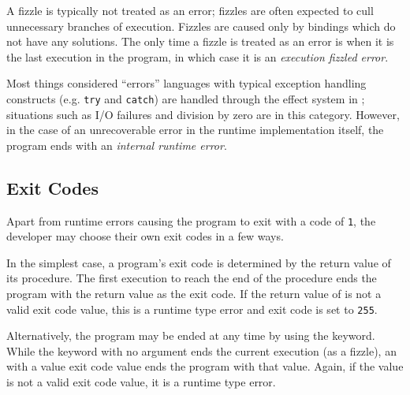 A fizzle is typically not treated as an error; fizzles are often expected
to cull unnecessary branches of execution. Fizzles are caused only by bindings
which do not have any solutions. The only time a fizzle is treated as an error
is when it is the last execution in the program, in which case it is an \emph{execution
fizzled error}.

Most things considered ``errors'' languages with typical exception
handling constructs (e.g. \texttt{try} and \texttt{catch}) are handled through
the effect system in \Trilogy{}; situations such as I/O failures and division by
zero are in this category. However, in the case of an unrecoverable error in the
runtime implementation itself, the program ends with an \emph{internal runtime error}.

\subsection{Exit Codes}
\label{sec:exitcode}

Apart from runtime errors causing the program to exit with a code of \texttt{1},
the developer may choose their own exit codes in a few ways.

In the simplest case, a \Trilogy{} program's exit code is determined by the
return value of its  procedure. The first execution to reach the end
of the  procedure ends the program with the return value as the exit
code. If the return value of  is not a valid exit code value, this
is a runtime type error and exit code is set to \texttt{255}.

Alternatively, the program may be ended at any time by using the  keyword.
While the  keyword with no argument ends the current execution (as a fizzle),
an  with a value exit code value ends the program with that value. Again, if
the value is not a valid exit code value, it is a runtime type error.
